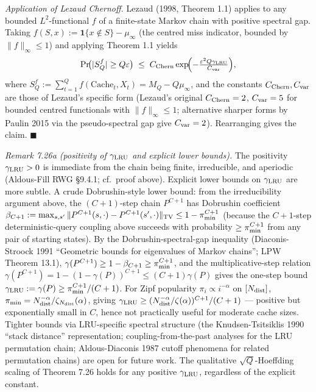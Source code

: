 \documentclass[
]{article}
\begin{document}
\emph{Application of Lezaud Chernoff.} Lezaud (1998, Theorem 1.1)
applies to any bounded $L^2$-functional $f$ of a finite-state
Markov chain with positive spectral gap. Taking
$f(S, x) := \mathbf{1}\{x \notin S\} - \mu_\infty$ (the centred
miss indicator, bounded by $\|f\|_\infty \leq 1$) and applying
Theorem 1.1 yields
\[
  \Pr\!\bigl(|S_Q^f| \geq Q \varepsilon \bigr)
  \;\leq\; C_{\rm Chern} \exp\!\Bigl( -\tfrac{\varepsilon^2 Q
  \gamma_{\rm LRU}}{C_{\rm var}}\Bigr) ,
\]
where $S_Q^f := \sum_{t=1}^{Q} f(\mathrm{Cache}_t, X_t) = M_Q - Q
\mu_\infty$, and the constants $C_{\rm Chern}, C_{\rm var}$ are
those of Lezaud's specific form (Lezaud's original $C_{\rm Chern}
= 2$, $C_{\rm var} = 5$ for bounded centred functionals with
$\|f\|_\infty \leq 1$; alternative sharper forms by Paulin 2015
via the pseudo-spectral gap give $C_{\rm var} = 2$). Rearranging
gives the claim. \hfill$\blacksquare$

\emph{Remark 7.26a (positivity of $\gamma_{\rm LRU}$ and explicit
lower bounds).} The positivity $\gamma_{\rm LRU} > 0$ is immediate
from the chain being finite, irreducible, and aperiodic (Aldous-Fill
RWG §9.4.1; cf.\ proof above). Explicit lower bounds on
$\gamma_{\rm LRU}$ are more subtle. A crude Dobrushin-style lower
bound: from the irreducibility argument above, the $(C+1)$-step
chain $P^{C+1}$ has Dobrushin coefficient $\beta_{C+1} := \max_{s,
s'} \|P^{C+1}(s, \cdot) - P^{C+1}(s', \cdot)\|_{\rm TV} \leq 1 -
\pi_{\rm min}^{C+1}$ (because the $C+1$-step deterministic-query
coupling above succeeds with probability $\geq \pi_{\rm min}^{C+1}$
from any pair of starting states). By the Dobrushin-spectral-gap
inequality (Diaconis-Stroock 1991 ``Geometric bounds for
eigenvalues of Markov chains''; LPW Theorem 13.1), $\gamma(P^{C+1})
\geq 1 - \beta_{C+1} \geq \pi_{\rm min}^{C+1}$, and the
multiplicative-step relation $\gamma(P^{C+1}) = 1 - (1 -
\gamma(P))^{C+1} \leq (C+1) \gamma(P)$ gives the one-step bound
$\gamma_{\rm LRU} := \gamma(P) \geq \pi_{\rm min}^{C+1} / (C+1)$.
For Zipf popularity $\pi_i \propto i^{-\alpha}$ on $[N_{\rm dist}]$,
$\pi_{\rm min} = N_{\rm dist}^{-\alpha} / \zeta_{N_{\rm dist}}(\alpha)$,
giving $\gamma_{\rm LRU} \geq (N_{\rm dist}^{-\alpha}/\zeta(\alpha))^{C+1}
/ (C+1)$ --- positive but exponentially small in $C$, hence not
practically useful for moderate cache sizes. Tighter bounds via
LRU-specific spectral structure (the Knudsen-Tsitsiklis 1990
``stack distance'' representation; coupling-from-the-past analyses
for the LRU permutation chain; Aldous-Diaconis 1987 cutoff
phenomena for related permutation chains) are open for future
work. The qualitative $\sqrt{Q}$-Hoeffding scaling of Theorem 7.26
holds for any positive $\gamma_{\rm LRU}$, regardless of the
explicit constant.
\end{document}
